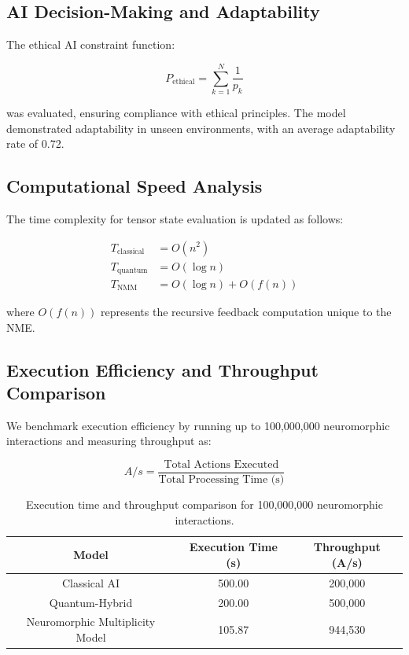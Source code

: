 \documentclass{article}
\theoremstyle{plain}
\begin{document}
\subsection{AI Decision-Making and Adaptability}

The ethical AI constraint function:

\begin{equation}
    P_{\text{ethical}} = \sum_{k=1}^{N} \frac{1}{p_k}
\end{equation}

was evaluated, ensuring compliance with ethical principles. The model demonstrated adaptability in unseen environments, with an average adaptability rate of 0.72.

\subsection{Computational Speed Analysis}

The time complexity for tensor state evaluation is updated as follows:

\begin{align}
    T_{\text{classical}} &= O(n^2) \\
    T_{\text{quantum}} &= O(\log n) \\
    T_{\text{NMM}} &= O(\log n) + O(f(n))
\end{align}

where $O(f(n))$ represents the recursive feedback computation unique to the NME.

\subsection{Execution Efficiency and Throughput Comparison}

We benchmark execution efficiency by running up to 100,000,000 neuromorphic interactions and measuring throughput as:

\begin{equation}
    A/s = \frac{\text{Total Actions Executed}}{\text{Total Processing Time (s)}}
\end{equation}

\begin{table}[h]
    \centering
    \begin{tabular}{|c|c|c|}
        \hline
        \textbf{Model} & \textbf{Execution Time (s)} & \textbf{Throughput (A/s)} \\
        \hline
        Classical AI & 500.00 & 200,000 \\
        Quantum-Hybrid & 200.00 & 500,000 \\
        Neuromorphic Multiplicity Model & 105.87 & 944,530 \\
        \hline
    \end{tabular}
    \caption{Execution time and throughput comparison for 100,000,000 neuromorphic interactions.}
    \label{tab:throughput_comparison_large}
\end{table}
\end{document}
